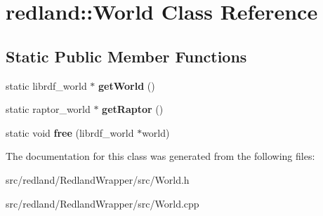 \hypertarget{classredland_1_1World}{}\section{redland\+:\+:World Class Reference}
\label{classredland_1_1World}
\subsection*{Static Public Member Functions}
\begin{DoxyCompactItemize}
\item 
\mbox{\label{classredland_1_1World_ad7618363c9b7da4c87367707c1a159d7}} 
static librdf\+\_\+world $\ast$ {\bfseries get\+World} ()
\item 
\mbox{\label{classredland_1_1World_aac0ce4018279ced7b38a36d74bb10cec}} 
static raptor\+\_\+world $\ast$ {\bfseries get\+Raptor} ()
\item 
\mbox{\label{classredland_1_1World_ade64918f10ee6ee0f5b8a0cb2e01666b}} 
static void {\bfseries free} (librdf\+\_\+world $\ast$world)
\end{DoxyCompactItemize}


The documentation for this class was generated from the following files\+:\begin{DoxyCompactItemize}
\item 
src/redland/\+Redland\+Wrapper/src/World.\+h\item 
src/redland/\+Redland\+Wrapper/src/World.\+cpp\end{DoxyCompactItemize}
